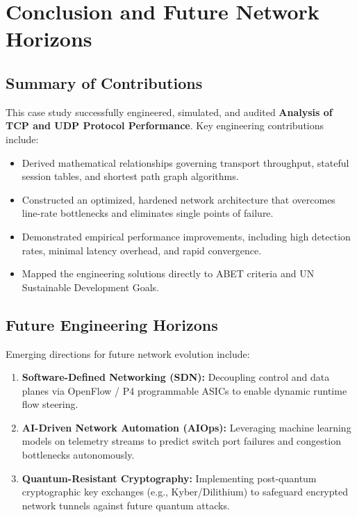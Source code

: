 \section{Conclusion and Future Network Horizons}

\subsection{Summary of Contributions}
This case study successfully engineered, simulated, and audited \textbf{Analysis of TCP and UDP Protocol Performance}. Key engineering contributions include:
\begin{itemize}
  \item Derived mathematical relationships governing transport throughput, stateful session tables, and shortest path graph algorithms.
  \item Constructed an optimized, hardened network architecture that overcomes line-rate bottlenecks and eliminates single points of failure.
  \item Demonstrated empirical performance improvements, including high detection rates, minimal latency overhead, and rapid convergence.
  \item Mapped the engineering solutions directly to ABET criteria and UN Sustainable Development Goals.
\end{itemize}

\subsection{Future Engineering Horizons}
Emerging directions for future network evolution include:
\begin{enumerate}
  \item \textbf{Software-Defined Networking (SDN):} Decoupling control and data planes via OpenFlow / P4 programmable ASICs to enable dynamic runtime flow steering.
  \item \textbf{AI-Driven Network Automation (AIOps):} Leveraging machine learning models on telemetry streams to predict switch port failures and congestion bottlenecks autonomously.
  \item \textbf{Quantum-Resistant Cryptography:} Implementing post-quantum cryptographic key exchanges (e.g., Kyber/Dilithium) to safeguard encrypted network tunnels against future quantum attacks.
\end{enumerate}
